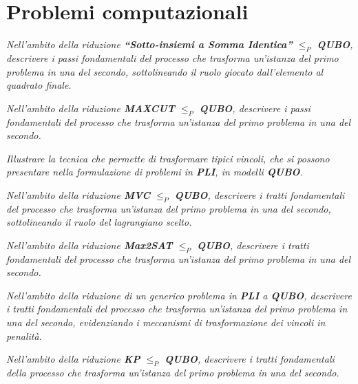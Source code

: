 \documentclass[a4paper]{article}
\begin{document}
\section{Problemi computazionali}
\emph{Nell’ambito della riduzione \textbf{“Sotto-insiemi a Somma Identica”} $\leq_P$ \textbf{QUBO}, descrivere i passi fondamentali del processo che trasforma un’istanza del primo problema in una del secondo, sottolineando il ruolo giocato dall’elemento al quadrato finale.}

\emph{Nell’ambito della riduzione \textbf{MAXCUT} $\leq_P$ \textbf{QUBO}, descrivere i passi fondamentali del processo che trasforma un’istanza del primo problema in una del secondo.}

\emph{Illustrare la tecnica che permette di trasformare tipici vincoli, che si possono presentare nella formulazione di problemi in \textbf{PLI}, in modelli \textbf{QUBO}.}

\emph{Nell’ambito della riduzione \textbf{MVC} $\leq_P$ \textbf{QUBO}, descrivere i tratti fondamentali del processo che trasforma un’istanza del primo problema in una del secondo, sottolineando il ruolo del lagrangiano scelto.}

\emph{Nell’ambito della riduzione \textbf{Max2SAT} $\leq_P$ \textbf{QUBO}, descrivere i tratti fondamentali del processo che trasforma un’istanza del primo problema in una del secondo.}

\emph{Nell’ambito della riduzione di un generico problema in \textbf{PLI} a \textbf{QUBO}, descrivere i tratti fondamentali del processo che trasforma un’istanza del primo problema in una del secondo, evidenziando i meccanismi di trasformazione dei vincoli in penalità.}

\emph{Nell’ambito della riduzione \textbf{KP} $\leq_P$ \textbf{QUBO}, descrivere i tratti fondamentali della processo che trasforma un’istanza del primo problema in una del secondo.}
\end{document}
